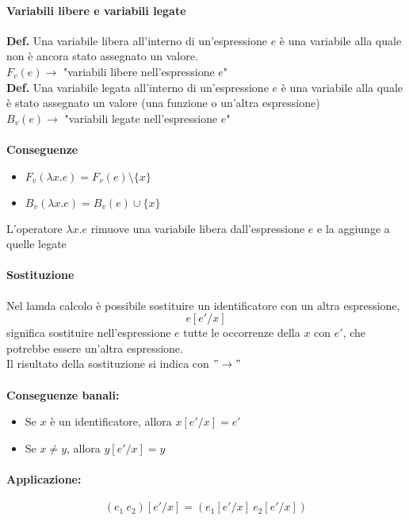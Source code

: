 \documentclass[a4paper,12pt]{article}
\begin{document}
\paragraph{Variabili libere e variabili legate\\}
\textbf{Def.} Una variabile libera all'interno di un'espressione $e$ è una variabile alla quale non è ancora stato assegnato un valore.\\
$F_{v}(e) \rightarrow$ "variabili libere nell'espressione $e$"\\
\textbf{Def.} Una variabile legata all'interno di un'espressione $e$ è una variabile alla quale è stato assegnato un valore (una funzione o un'altra espressione)\\
$B_{v}(e) \rightarrow$ "variabili legate nell'espressione $e$"\\
\\\textbf{Conseguenze\\}
\begin{itemize}
	\item $F_{v}(\lambda x.e) = F_{v}(e) \setminus \{x\}$
	\item $B_{v}(\lambda x.e) = B_{v}(e) \cup \{x\}$
\end{itemize}
L'operatore $\lambda x.e$ rimuove una variabile libera dall'espressione $e$ e la aggiunge a quelle legate

\paragraph{Sostituzione\\}
Nel lamda calcolo è possibile sostituire un identificatore con un altra espressione, \[e[e'/x]\] significa sostituire nell'espressione $e$ tutte le occorrenze della $x$ con $e'$, che potrebbe essere un'altra espressione.\\
Il risultato della sostituzione si indica con $"\rightarrow"$\\
\textbf{\\Conseguenze banali:}
\begin{itemize}
	\item Se $x$ è un identificatore, allora $x[e'/x] = e'$
	\item Se $x \neq y$, allora $y[e'/x] = y$
\end{itemize}

\paragraph{Applicazione:} \[ (e_{1} \ e_{2})[e' / x] = (e_{1}[e'/x] \ e_{2}[e'/x]) \]
\end{document}
